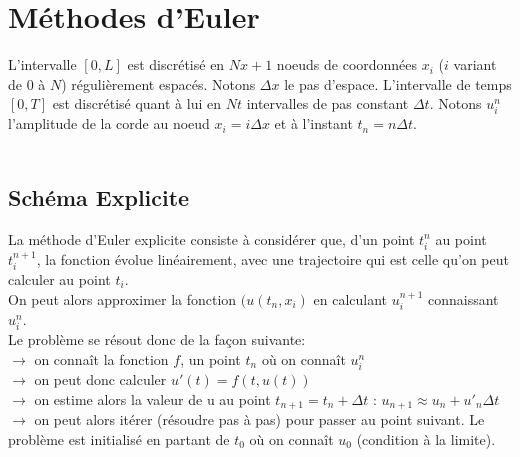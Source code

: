 \section{Méthodes d'Euler}

L'intervalle $[0,L]$ est discrétisé en $Nx+1$ noeuds de coordonnées $x_{i}$ ($i$ variant de $0$ à $N$) régulièrement espacés. Notons $\Delta x$ le pas d'espace. L'intervalle de temps $[0,T]$ est discrétisé quant à lui en $Nt$ intervalles de pas constant $\Delta t$. Notons $u^{n}_{i}$ l'amplitude de la corde au noeud $x_{i} = i\Delta x$ et à l'instant $t_{n} = n\Delta t$.\\\\

\subsection{Schéma Explicite}

La méthode d'Euler explicite consiste à considérer que, d'un point $t^n_{i}$ au point $t^{n+1}_{i}$, la fonction évolue linéairement, avec une trajectoire qui est celle qu'on peut calculer au point $t_i$.\\
On peut alors approximer la fonction $(u(t_n,x_i)$ en  calculant $u^{n+1}_{i}$ connaissant $u^n_{i}$.\\


Le problème se résout donc de la façon suivante:\\
$\rightarrow$ on connaît la fonction $f$, un point $t_n$ où on connaît $u^n_{i}$\\
$\rightarrow$ on peut donc calculer $u'(t)=f(t,u(t))$ \\
$\rightarrow$ on estime alors la valeur de u au point $t_{n+1} = t_n + \Delta t$ : $u_{n+1} \approx u_n + u'_n\Delta t$\\
$\rightarrow$ on peut alors itérer (résoudre pas à pas) pour passer au point suivant. Le problème est initialisé en partant de $t_0$ où on connaît $u_0$ (condition à la limite).\\


